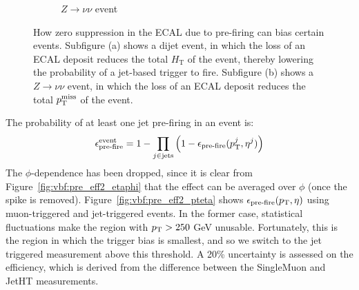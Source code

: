 \begin{figure}[]
\begin{center}
\begin{subfigure}[t]{0.49\textwidth}
            \caption{$Z\rightarrow\nu\nu$ event}
        \end{subfigure}
        \caption{How zero suppression in the ECAL due to pre-firing can bias certain events.
                 Subfigure (a) shows a dijet event, in which the loss of an ECAL deposit reduces the total $H_\mathrm{T}$ of the event, thereby lowering the probability of a jet-based trigger to fire.
                 Subfigure (b) shows a $Z\rightarrow\nu\nu$ event, in which the loss of an ECAL deposit reduces the total $p_\mathrm{T}^\mathrm{miss}$ of the event.}
        \label{fig:vbf:pre_diag}
    \end{center}
\end{figure}

The probability of at least one jet pre-firing in an event is:
\begin{equation}
    \epsilon_\text{pre-fire}^\text{event} = 1 - \prod_{j\in\text{jets}}  \left(1-\epsilon_\text{pre-fire}(p_\mathrm{T}^j,\eta^j)\right)
\end{equation}
The $\phi$-dependence has been dropped, since it is clear from Figure~\ref{fig:vbf:pre_eff2_etaphi} that the effect can be averaged over $\phi$ (once the spike is removed). 
Figure~\ref{fig:vbf:pre_eff2_pteta} shows $\epsilon_\text{pre-fire}(p_\mathrm{T},\eta)$ using muon-triggered and jet-triggered events.
In the former case, statistical fluctuations make the region with $p_\mathrm{T}>250$ GeV unusable.
Fortunately, this is the region in which the trigger bias is smallest, and so we switch to the jet triggered measurement above this threshold.
A 20\% uncertainty is assessed on the efficiency, which is derived from the difference between the SingleMuon and JetHT measurements. 

